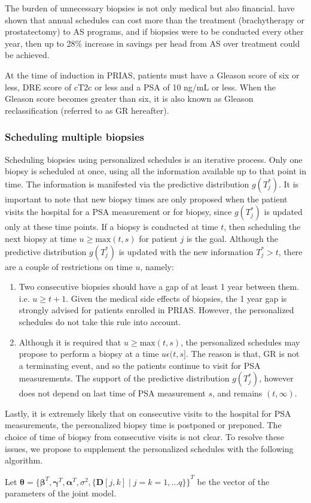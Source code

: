 The burden of unnecessary biopsies is not only medical but also financial. \citet{keegan2012active} have shown that annual schedules can cost more than the treatment (brachytherapy or prostatectomy) to AS programs, and if biopsies were to be conducted every other year, then up to 28\% increase in savings per head from AS over treatment could be achieved.

At the time of induction in PRIAS, patients must have a Gleason score of six or less, DRE score of cT2c or less and a PSA of 10 ng/mL or less. When the Gleason score becomes greater than six, it is also known as Gleason reclassification (referred to as GR hereafter).

\subsubsection{Scheduling multiple biopsies}
\label{subsubsec : pers_sched_algorithm}
Scheduling biopsies using personalized schedules is an iterative process. Only one biopsy is scheduled at once, using all the information available up to that point in time. The information is manifested via the predictive distribution $g(T^*_j)$. It is important to note that new biopsy times are only proposed when the patient visits the hospital for a PSA measurement or for biopsy, since $g(T^*_j)$ is updated only at these time points. If a biopsy is conducted at time $t$, then scheduling the next biopsy at time $u \geq \text{max}(t,s)$ for patient $j$ is the goal. Although the predictive distribution $g(T^*_j)$ is updated with the new information $T^*_j > t$, there are a couple of restrictions on time $u$, namely:

\begin{enumerate}
\item Two consecutive biopsies should have a gap of at least 1 year between them. i.e. $u \geq t + 1$. Given the medical side effects of biopsies, the 1 year gap is strongly advised for patients enrolled in PRIAS. However, the personalized schedules do not take this rule into account.
\item Although it is required that $u \geq \text{max}(t,s)$, the personalized schedules may propose to perform a biopsy at a time $u \epsilon (t, s]$. The reason is that, GR is not a terminating event, and so the patients continue to visit for PSA measurements. The support of the predictive distribution $g(T^*_j)$, however does not depend on last time of PSA measurement $s$, and remains $(t, \infty)$.
\end{enumerate}
 
Lastly, it is extremely likely that on consecutive visits to the hospital for PSA measurements, the personalized biopsy time is postponed or preponed. The choice of time of biopsy from consecutive visits is not clear. To resolve these issues, we propose to supplement the personalized schedules with the following algorithm.


Let $\boldsymbol{\theta} = {\{\boldsymbol{\beta}^T, \boldsymbol{\gamma}^T, \boldsymbol{\alpha}^T, \sigma^2, \{\boldsymbol{D}[j,k] \mid j=k=1, \ldots q\}\}}^T$ be the vector of the parameters of the joint model.

